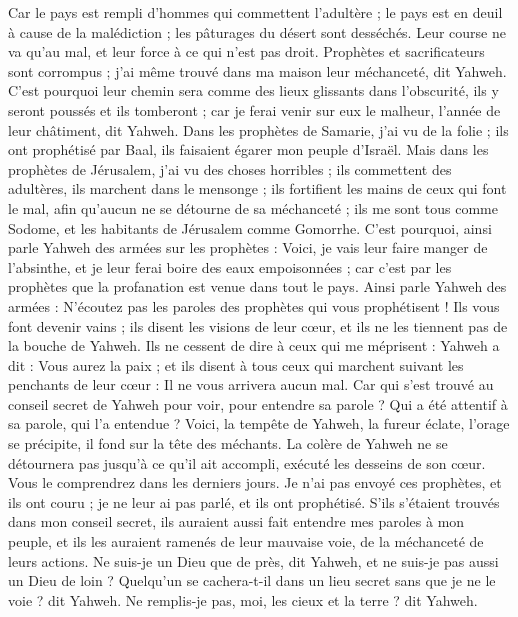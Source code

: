 \begin{multicols}{2}
Car le pays est rempli d'hommes qui commettent l’adultère ; le pays est en deuil à cause de la malédiction ; les pâturages du désert sont desséchés. Leur course ne va qu’au mal, et leur force à ce qui n’est pas droit.
Prophètes et sacrificateurs sont corrompus ; j'ai même trouvé dans ma maison leur méchanceté, dit Yahweh.
C'est pourquoi leur chemin sera comme des lieux glissants dans l’obscurité, ils y seront poussés et ils tomberont ; car je ferai venir sur eux le malheur, l'année de leur châtiment, dit Yahweh.
Dans les prophètes de Samarie, j’ai vu de la folie ; ils ont prophétisé par Baal, ils faisaient égarer mon peuple d’Israël.
Mais dans les prophètes de Jérusalem, j’ai vu des choses horribles ; ils commettent des adultères, ils marchent dans le mensonge ; ils fortifient les mains de ceux qui font le mal, afin qu’aucun ne se détourne de sa méchanceté ; ils me sont tous comme Sodome, et les habitants de Jérusalem comme Gomorrhe.
C'est pourquoi, ainsi parle Yahweh des armées sur les prophètes : Voici, je vais leur faire manger de l'absinthe, et je leur ferai boire des eaux empoisonnées ; car c’est par les prophètes que la profanation est venue dans tout le pays.
Ainsi parle Yahweh des armées : N'écoutez pas les paroles des prophètes qui vous prophétisent ! Ils vous font devenir vains ; ils disent les visions de leur cœur, et ils ne les tiennent pas de la bouche de Yahweh.
Ils ne cessent de dire à ceux qui me méprisent : Yahweh a dit : Vous aurez la paix ; et ils disent à tous ceux qui marchent suivant les penchants de leur cœur : Il ne vous arrivera aucun mal.
Car qui s'est trouvé au conseil secret de Yahweh pour voir, pour entendre sa parole ? Qui a été attentif à sa parole, qui l'a entendue ?
Voici, la tempête de Yahweh, la fureur éclate, l’orage se précipite, il fond sur la tête des méchants.
La colère de Yahweh ne se détournera pas jusqu’à ce qu'il ait accompli, exécuté les desseins de son cœur. Vous le comprendrez dans les derniers jours.
Je n'ai pas envoyé ces prophètes, et ils ont couru ; je ne leur ai pas parlé, et ils ont prophétisé.
S'ils s'étaient trouvés dans mon conseil secret, ils auraient aussi fait entendre mes paroles à mon peuple, et ils les auraient ramenés de leur mauvaise voie, de la méchanceté de leurs actions.
Ne suis-je un Dieu que de près, dit Yahweh, et ne suis-je pas aussi un Dieu de loin ?
Quelqu'un se cachera-t-il dans un lieu secret sans que je ne le voie ? dit Yahweh. Ne remplis-je pas, moi, les cieux et la terre ? dit Yahweh.

\end{multicols}
